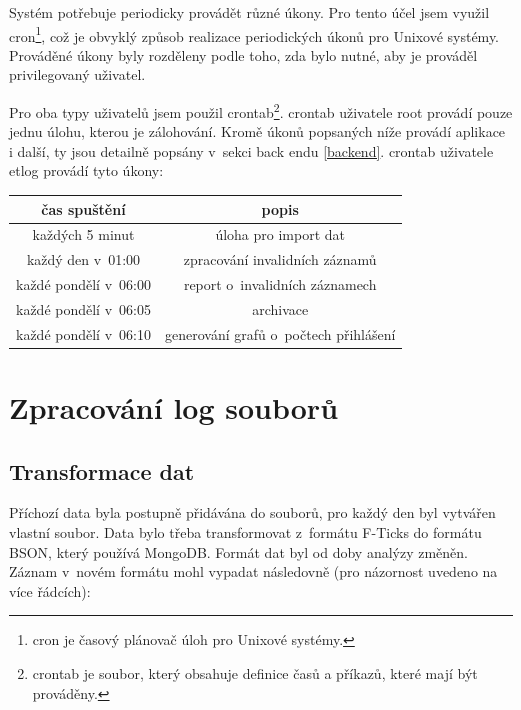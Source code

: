 \documentclass[thesis=M,czech]{FITthesis}[2012/06/26]
\begin{document}
      Systém potřebuje periodicky provádět různé úkony.
      Pro tento účel jsem využil cron\footnote{
        cron je časový plánovač úloh pro Unixové systémy.
      }, což je obvyklý způsob realizace periodických úkonů pro Unixové systémy.
      Prováděné úkony byly rozděleny podle toho, zda bylo nutné,
      aby je prováděl privilegovaný uživatel.

      Pro oba typy uživatelů jsem použil crontab\footnote{
        crontab je soubor, který obsahuje definice časů a příkazů, které mají být prováděny.
      }.
      crontab uživatele root provádí pouze jednu úlohu, kterou je zálohování.
      Kromě úkonů popsaných níže provádí aplikace i další, ty jsou detailně popsány v~sekci back endu \ref{backend}.
      crontab uživatele etlog provádí tyto úkony:

      \begin{center}
        \begin{tabular}{ | c | c | }
          \hline
            čas spuštění          & popis                                      \\ \hline
            každých 5 minut       & úloha pro import dat                       \\ \hline
            každý den v~01:00     & zpracování invalidních záznamů             \\ \hline
            každé pondělí v~06:00 & report o~invalidních záznamech             \\ \hline
            každé pondělí v~06:05 & archivace                                  \\ \hline
            každé pondělí v~06:10 & generování grafů o~počtech přihlášení      \\
          \hline
        \end{tabular}
      \end{center}

  \section{Zpracování log souborů}
    \label{logs_processing}

    \subsection{Transformace dat}

      Příchozí data byla postupně přidávána do souborů, pro každý den byl vytvářen vlastní soubor.
      Data bylo třeba transformovat z~formátu F-Ticks do formátu BSON, který používá MongoDB.
      Formát dat byl od doby analýzy změněn. Záznam v~novém formátu mohl vypadat následovně 
      (pro názornost uvedeno na více řádcích):
\end{document}

